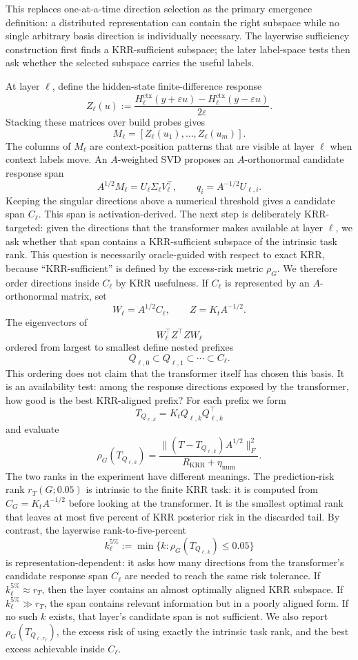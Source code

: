 \documentclass[11pt]{article}
\begin{document}
This replaces one-at-a-time direction selection as the primary emergence definition: a distributed
representation can contain the right subspace while no single arbitrary basis direction is
individually necessary. The layerwise sufficiency construction first finds a KRR-sufficient
subspace; the later label-space tests then ask whether the selected subspace carries the useful
labels.

At layer \(\ell\), define the hidden-state finite-difference response
\[
Z_\ell(u)
:=
\frac{
H_\ell^{\mathrm{ctx}}(y+\varepsilon u)-H_\ell^{\mathrm{ctx}}(y-\varepsilon u)
}{2\varepsilon}.
\]
Stacking these matrices over build probes gives
\[
M_\ell=[Z_\ell(u_1),\ldots,Z_\ell(u_m)].
\]
The columns of \(M_\ell\) are context-position patterns that are visible at layer \(\ell\) when
context labels move. An \(A\)-weighted SVD proposes an \(A\)-orthonormal candidate response span
\[
A^{1/2}M_\ell=U_\ell\Sigma_\ell V_\ell^\top,
\qquad
q_i=A^{-1/2}U_{\ell,i}.
\]
Keeping the singular directions above a numerical threshold gives a candidate span \(C_\ell\). This
span is activation-derived. The next step is deliberately KRR-targeted: given the directions that the
transformer makes available at layer \(\ell\), we ask whether that span contains a
KRR-sufficient subspace of the intrinsic task rank. This question is necessarily oracle-guided with
respect to exact KRR, because ``KRR-sufficient'' is defined by the excess-risk metric
\(\rho_G\). We therefore order directions inside \(C_\ell\) by KRR usefulness. If \(C_\ell\) is
represented by an \(A\)-orthonormal matrix, set
\[
W_\ell=A^{1/2}C_\ell,
\qquad
Z=K_tA^{-1/2}.
\]
The eigenvectors of
\[
W_\ell^\top Z^\top ZW_\ell
\]
ordered from largest to smallest define nested prefixes
\[
Q_{\ell,0}\subset Q_{\ell,1}\subset\cdots\subset C_\ell.
\]
This ordering does not claim that the transformer itself has chosen this basis. It is an availability
test: among the response directions exposed by the transformer, how good is the best KRR-aligned
prefix?
For each prefix we form
\[
T_{Q_{\ell,k}}=K_tQ_{\ell,k}Q_{\ell,k}^\top
\]
and evaluate
\[
\rho_G(T_{Q_{\ell,k}})
=
\frac{\|(T-T_{Q_{\ell,k}})A^{1/2}\|_F^2}{R_{\mathrm{KRR}}+\eta_{\mathrm{num}}}.
\]
The two ranks in the experiment have different meanings. The prediction-risk rank
\(r_T(G;0.05)\) is intrinsic to the finite KRR task: it is computed from
\(C_G=K_tA^{-1/2}\) before looking at the transformer. It is the smallest optimal rank that leaves
at most five percent of KRR posterior risk in the discarded tail. By contrast, the layerwise
rank-to-five-percent
\[
k_\ell^{5\%}
:=
\min\{k:\rho_G(T_{Q_{\ell,k}})\le0.05\}
\]
is representation-dependent: it asks how many directions from the transformer's candidate response
span \(C_\ell\) are needed to reach the same risk tolerance. If \(k_\ell^{5\%}\approx r_T\), then
the layer contains an almost optimally aligned KRR subspace. If \(k_\ell^{5\%}\gg r_T\), the span
contains relevant information but in a poorly aligned form. If no such \(k\) exists, that layer's
candidate span is not sufficient. We also report \(\rho_G(T_{Q_{\ell,r_T}})\), the excess risk of
using exactly the intrinsic task rank, and the best excess achievable inside \(C_\ell\).
\end{document}
